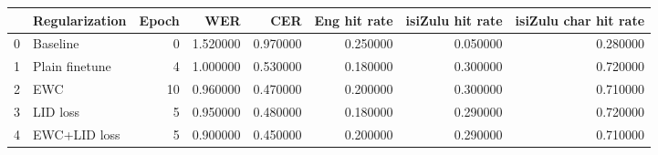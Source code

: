 \begin{tabular}{llrrrrrr}
\toprule
 & Regularization & Epoch & WER & CER & Eng hit rate & isiZulu hit rate & isiZulu char hit rate \\
\midrule
0 & Baseline & 0 & 1.520000 & 0.970000 & 0.250000 & 0.050000 & 0.280000 \\
1 & Plain finetune & 4 & 1.000000 & 0.530000 & 0.180000 & 0.300000 & 0.720000 \\
2 & EWC & 10 & 0.960000 & 0.470000 & 0.200000 & 0.300000 & 0.710000 \\
3 & LID loss & 5 & 0.950000 & 0.480000 & 0.180000 & 0.290000 & 0.720000 \\
4 & EWC+LID loss & 5 & 0.900000 & 0.450000 & 0.200000 & 0.290000 & 0.710000 \\
\bottomrule
\end{tabular}

